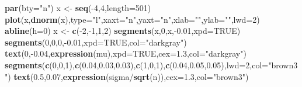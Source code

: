\documentclass[]{article}
\newenvironment{Shaded}{\begin{snugshade}}{\end{snugshade}}
\newcommand{\KeywordTok}[1]{\textcolor[rgb]{0.13,0.29,0.53}{\textbf{{#1}}}}
\newcommand{\DataTypeTok}[1]{\textcolor[rgb]{0.13,0.29,0.53}{{#1}}}
\newcommand{\DecValTok}[1]{\textcolor[rgb]{0.00,0.00,0.81}{{#1}}}
\newcommand{\FloatTok}[1]{\textcolor[rgb]{0.00,0.00,0.81}{{#1}}}
\newcommand{\StringTok}[1]{\textcolor[rgb]{0.31,0.60,0.02}{{#1}}}
\newcommand{\OtherTok}[1]{\textcolor[rgb]{0.56,0.35,0.01}{{#1}}}
\newcommand{\NormalTok}[1]{{#1}}
\begin{document}
\begin{Shaded}
\begin{Highlighting}[]
\KeywordTok{par}\NormalTok{(}\DataTypeTok{bty=}\StringTok{"n"}\NormalTok{)}
\NormalTok{x <-}\StringTok{ }\KeywordTok{seq}\NormalTok{(-}\DecValTok{4}\NormalTok{,}\DecValTok{4}\NormalTok{,}\DataTypeTok{length=}\DecValTok{501}\NormalTok{)}
\KeywordTok{plot}\NormalTok{(x,}\KeywordTok{dnorm}\NormalTok{(x),}\DataTypeTok{type=}\StringTok{"l"}\NormalTok{,}\DataTypeTok{xaxt=}\StringTok{"n"}\NormalTok{,}\DataTypeTok{yaxt=}\StringTok{"n"}\NormalTok{,}\DataTypeTok{xlab=}\StringTok{""}\NormalTok{,}\DataTypeTok{ylab=}\StringTok{""}\NormalTok{,}\DataTypeTok{lwd=}\DecValTok{2}\NormalTok{)}
\KeywordTok{abline}\NormalTok{(}\DataTypeTok{h=}\DecValTok{0}\NormalTok{)}
\NormalTok{x <-}\StringTok{ }\KeywordTok{c}\NormalTok{(-}\DecValTok{2}\NormalTok{,-}\DecValTok{1}\NormalTok{,}\DecValTok{1}\NormalTok{,}\DecValTok{2}\NormalTok{)}
\KeywordTok{segments}\NormalTok{(x,}\DecValTok{0}\NormalTok{,x,-}\FloatTok{0.01}\NormalTok{,}\DataTypeTok{xpd=}\OtherTok{TRUE}\NormalTok{)}
\KeywordTok{segments}\NormalTok{(}\DecValTok{0}\NormalTok{,}\DecValTok{0}\NormalTok{,}\DecValTok{0}\NormalTok{,-}\FloatTok{0.01}\NormalTok{,}\DataTypeTok{xpd=}\OtherTok{TRUE}\NormalTok{,}\DataTypeTok{col=}\StringTok{"darkgray"}\NormalTok{)}
\KeywordTok{text}\NormalTok{(}\DecValTok{0}\NormalTok{,-}\FloatTok{0.04}\NormalTok{,}\KeywordTok{expression}\NormalTok{(mu),}\DataTypeTok{xpd=}\OtherTok{TRUE}\NormalTok{,}\DataTypeTok{cex=}\FloatTok{1.3}\NormalTok{,}\DataTypeTok{col=}\StringTok{"darkgray"}\NormalTok{)}
\KeywordTok{segments}\NormalTok{(}\KeywordTok{c}\NormalTok{(}\DecValTok{0}\NormalTok{,}\DecValTok{0}\NormalTok{,}\DecValTok{1}\NormalTok{),}\KeywordTok{c}\NormalTok{(}\FloatTok{0.04}\NormalTok{,}\FloatTok{0.03}\NormalTok{,}\FloatTok{0.03}\NormalTok{),}\KeywordTok{c}\NormalTok{(}\DecValTok{1}\NormalTok{,}\DecValTok{0}\NormalTok{,}\DecValTok{1}\NormalTok{),}\KeywordTok{c}\NormalTok{(}\FloatTok{0.04}\NormalTok{,}\FloatTok{0.05}\NormalTok{,}\FloatTok{0.05}\NormalTok{),}\DataTypeTok{lwd=}\DecValTok{2}\NormalTok{,}\DataTypeTok{col=}\StringTok{"brown3"}\NormalTok{)}
\KeywordTok{text}\NormalTok{(}\FloatTok{0.5}\NormalTok{,}\FloatTok{0.07}\NormalTok{,}\KeywordTok{expression}\NormalTok{(sigma/}\KeywordTok{sqrt}\NormalTok{(n)),}\DataTypeTok{cex=}\FloatTok{1.3}\NormalTok{,}\DataTypeTok{col=}\StringTok{"brown3"}\NormalTok{)}
\end{Highlighting}
\end{Shaded}
\end{document}
